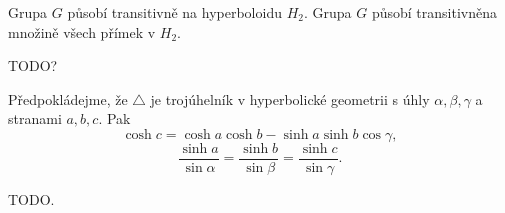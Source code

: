 \documentclass[12pt]{article}                   %
\begin{document}
        \begin{lemma}
            Grupa $G$ působí transitivně na hyperboloidu $H_2$. Grupa $G$ působí transitivněna množině všech přímek v $H_2$.

            \begin{dukazin}
                TODO?
            \end{dukazin}
        \end{lemma}

        \begin{veta}
            Předpokládejme, že $\triangle$ je trojúhelník v hyperbolické geometrii s úhly $\alpha, \beta, \gamma$ a stranami $a, b, c$. Pak
            $$ \cosh c = \cosh a \cosh b - \sinh a \sinh b \cos \gamma, $$
            $$ \frac{\sinh a}{\sin \alpha} = \frac{\sinh b}{\sin \beta} = \frac{\sinh c}{\sin \gamma}. $$

            \begin{dukazin}
                TODO.
            \end{dukazin}
        \end{veta}
\end{document}
